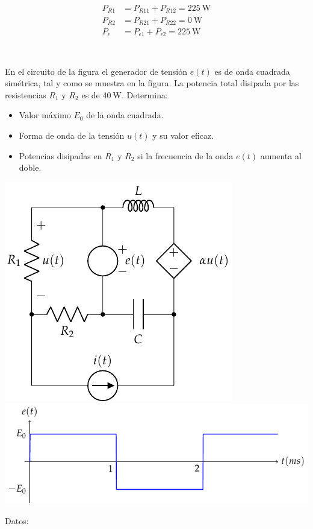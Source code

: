 \documentclass[12pt]{article}
\begin{document}
\begin{align*}
  P_{R1} &= P_{R11} + P_{R12} = \SI{225}{\watt}\\
  P_{R2} &= P_{R21} + P_{R22} = \SI{0}{\watt}\\
  P_{\epsilon} &= P_{\epsilon1} + P_{\epsilon2} = \SI{225}{\watt}\\
\end{align*}

\clearpage

\section{}

En el circuito de la figura el generador de tensión $e(t)$ es de onda cuadrada simétrica, tal y como se muestra en la figura. La potencia total disipada por las resistencias $R_1$ y $R_2$ es de $\SI{40}{\watt}$.
Determina:

\begin{itemize}
  \item Valor máximo $E_0$ de la onda cuadrada.
  \item Forma de onda de la tensión $u(t)$ y su valor eficaz.
  \item Potencias disipadas en $R_1$ y $R_2$ si la frecuencia de la onda $e(t)$ aumenta al doble.
\end{itemize}

\begin{center}
  \includegraphics{figs/superposicion3}
  \includegraphics{figs/superposicionOndaCuadrada}
\end{center}
Datos:
\end{document}
